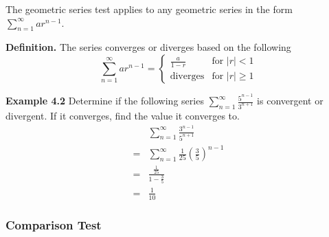\documentclass[12pt]{article}
\begin{document}
The geometric series test applies to any geometric series in the form $\displaystyle\sum_{n=1}^{\infty}ar^{n-1}$.

\textbf{Definition.} The series converges or diverges based on the following
\[
	\displaystyle\sum_{n=1}^{\infty}ar^{n-1} =
	\begin{cases}
		\displaystyle\frac{a}{1-r} & \text{for } |r| < 1    \\
		\text{diverges}            & \text{for } |r| \geq 1
	\end{cases}
\]

\textbf{Example 4.2} Determine if the following series $\displaystyle\sum_{n=1}^{\infty}\frac{5^{n-1}}{3^{n+1}}$ is convergent or divergent. If it converges, find the value it converges to.
\begin{align*}
	  & \displaystyle\sum_{n=1}^{\infty}\frac{3^{n-1}}{5^{n+1}}                   \\
	= & \displaystyle\sum_{n=1}^{\infty}\frac{1}{25}\left(\frac{3}{5}\right)^{n-1} \\
	= & \frac{\frac{1}{25}}{1-\frac{3}{5}}                                         \\
	= & \frac{1}{10}
\end{align*}

\subsubsection{Comparison Test}
\end{document}

